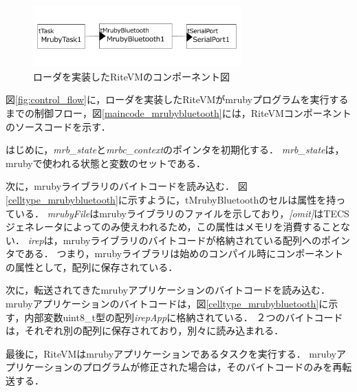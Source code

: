 \documentclass[submit,techrep]{ipsj}
\begin{document}
\begin{figure}[t]
    \centering
    \includegraphics[width=8cm,clip]{../EMSOFT2016/figure/component_bluetooth.pdf}
    \caption{ローダを実装したRiteVMのコンポーネント図}
    \label{fig:component_bluetooth}
\end{figure}

図\ref{fig:control_flow}に，ローダを実装したRiteVMがmrubyプログラムを実行するまでの制御フロー，図\ref{maincode_mrubybluetooth}には，RiteVMコンポーネントのソースコードを示す．

はじめに，{\it mrb\_state}と{\it mrbc\_context}のポインタを初期化する．
{\it mrb\_state}は，mrubyで使われる状態と変数のセットである．

次に，mrubyライブラリのバイトコードを読み込む．
図\ref{celltype_mrubybluetooth}に示すように，tMrubyBluetoothのセルは属性を持っている．
{\it mrubyFile}はmrubyライブラリのファイルを示しており，{\it [omit]}はTECSジェネレータによってのみ使えわれるため，この属性はメモリを消費することない．
{\it irep}は，mrubyライブラリのバイトコードが格納されている配列へのポインタである．
つまり，mrubyライブラリは始めのコンパイル時にコンポーネントの属性として，配列に保存されている．

次に，転送されてきたmrubyアプリケーションのバイトコードを読み込む．
mrubyアプリケーションのバイトコードは，図\ref{celltype_mrubybluetooth}に示す，内部変数uint8\_t型の配列{\it irepApp}に格納されている．
２つのバイトコードは，それぞれ別の配列に保存されており，別々に読み込まれる．

最後に，RiteVMはmrubyアプリケーションであるタスクを実行する．
mrubyアプリケーションのプログラムが修正された場合は，そのバイトコードのみを再転送する．
\end{document}
